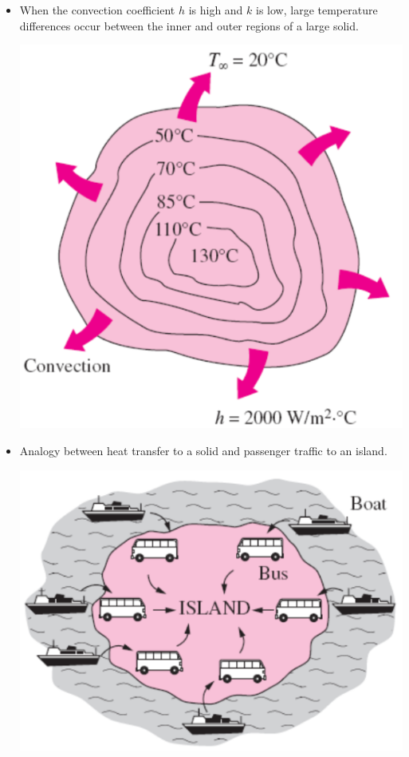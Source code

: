 \documentclass[11pt]{article}
\begin{document}
 \newpage

\begin{itemize}
\item When the convection coefficient \(h\) is high and \(k\) is low, large temperature differences occur between the inner and outer regions of a large solid.
\begin{center}
\includegraphics[width=.9\linewidth]{./images/biot-number-large-solid.png}
\end{center}
\end{itemize}

 \newpage

\begin{itemize}
\item Analogy between heat transfer to a solid and passenger traffic to an island.
\begin{center}
\includegraphics[width=.9\linewidth]{./images/biot-number-island-analogy.png}
\end{center}
\end{itemize}
\end{document}
